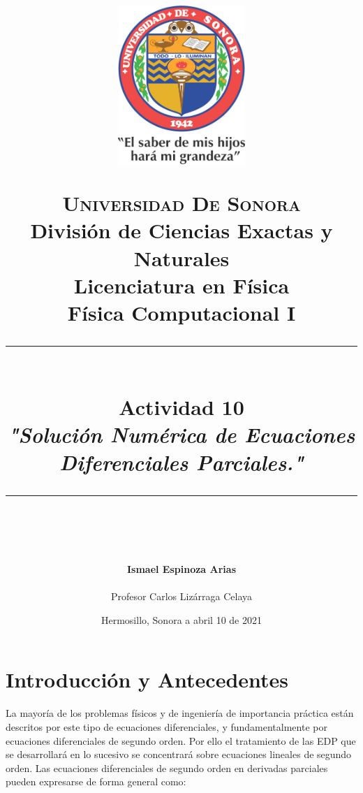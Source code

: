 \documentclass[12pt]{article}
\newcommand{\HRule}[1]{\rule{\linewidth}{#1}}
\begin{document}
\begin{titlepage}

\title{ \normalsize 
        \begin{center}
        \includegraphics[height=6cm]{Logo.jpg}
        \end{center}
        \LARGE \textsc{\textbf{Universidad De Sonora}} \\ \bigskip
		\Large División de Ciencias Exactas y Naturales \\
        Licenciatura en Física \\ \bigskip
        \bigskip
        Física Computacional I
		\\ [0.1cm]  
		\HRule{2pt} \\
		\Large \textbf{{Actividad 10}} \\
        \textit{\textbf{"Solución Numérica de Ecuaciones Diferenciales Parciales."}}
		\HRule{2pt} \\
		\normalsize \vspace*{0.001\baselineskip}}
        
\date{\bigskip \Large  \hspace*{\fill} Hermosillo, Sonora a abril 10 de 2021}

        
\author{
		\Large\textbf{Ismael Espinoza Arias} \\ \bigskip
        \\ \bigskip
       \Large Profesor Carlos Lizárraga Celaya}
       \end{titlepage}
       \maketitle
       
       


\section*{Introducción y Antecedentes}
La mayoría de los problemas físicos y de ingeniería de importancia práctica están descritos por este tipo de ecuaciones diferenciales, y fundamentalmente por ecuaciones diferenciales de segundo orden. Por ello el tratamiento de las EDP que se desarrollará en lo sucesivo se concentrará sobre ecuaciones lineales de segundo orden. Las ecuaciones diferenciales de segundo orden en derivadas parciales pueden expresarse de forma general como: 
\end{document}
